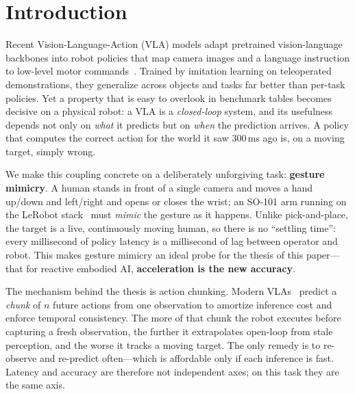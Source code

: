 \documentclass[blind]{gtac}
\begin{document}

\section{Introduction}
\label{sec:intro}

Recent Vision-Language-Action (VLA) models adapt pretrained vision-language
backbones into robot policies that map camera images and a language instruction
to low-level motor commands~\cite{rt2,openvla,pi0,smolvla}. Trained by imitation
learning on teleoperated demonstrations, they generalize across objects and
tasks far better than per-task policies. Yet a property that is easy to overlook
in benchmark tables becomes decisive on a physical robot: a VLA is a
\emph{closed-loop} system, and its usefulness depends not only on \emph{what} it
predicts but on \emph{when} the prediction arrives. A policy that computes the
correct action for the world it saw 300\,ms ago is, on a moving target, simply
wrong.

We make this coupling concrete on a deliberately unforgiving task:
\textbf{gesture mimicry}. A human stands in front of a single camera and moves a
hand up/down and left/right and opens or closes the wrist; an SO-101 arm running
on the LeRobot stack~\cite{lerobot} must \emph{mimic} the gesture as it happens.
Unlike pick-and-place, the target is a live, continuously moving human, so there
is no ``settling time'': every millisecond of policy latency is a millisecond of
lag between operator and robot. This makes gesture mimicry an ideal probe for the
thesis of this paper---that for reactive embodied AI, \textbf{acceleration is the
new accuracy}.

The mechanism behind the thesis is action chunking. Modern
VLAs~\cite{act,pi0,smolvla} predict a \emph{chunk} of $n$ future actions from one
observation to amortize inference cost and enforce temporal consistency. The more
of that chunk the robot executes before capturing a fresh observation, the
further it extrapolates open-loop from stale perception, and the worse it tracks
a moving target. The only remedy is to re-observe and re-predict often---which is
affordable only if each inference is fast. Latency and accuracy are therefore not
independent axes; on this task they are the same axis.
\end{document}
